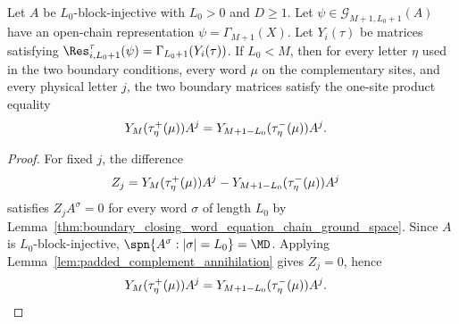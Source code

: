 \begin{lemma}
    \label{thm:boundary_closing_right_products_chain_ground_space}
    \leanok
    Let $A$ be $L_0$-block-injective with $L_0>0$ and $D\ge1$. Let
    $\psi\in\mathcal G_{M+1,L_0+1}(A)$ have an open-chain representation
    $\psi=\Gamma_{M+1}(X)$. Let $Y_i(\tau)$ be matrices satisfying
    $\Res^{\tau}_{i,L_0+1}(\psi) = \Gamma_{L_0+1}(Y_i(\tau))$.
    If $L_0<M$, then for every letter $\eta$ used in the two boundary
    conditions, every word $\mu$ on the complementary sites, and every physical
    letter $j$, the two boundary matrices satisfy the one-site product equality
    \begin{align}
        Y_M(\tau^{+}_{\eta}(\mu))A^j
         & =
        Y_{M+1-L_0}(\tau^{-}_{\eta}(\mu))A^j.
        \notag
    \end{align}
\end{lemma}

\begin{proof}
    \leanok
    For fixed $j$, the difference
    \begin{align}
        Z_j
         & =
        Y_M(\tau^{+}_{\eta}(\mu))A^j
        -
        Y_{M+1-L_0}(\tau^{-}_{\eta}(\mu))A^j
        \notag
    \end{align}
    satisfies $Z_jA^\sigma=0$ for every word $\sigma$ of length $L_0$ by
    Lemma~\ref{thm:boundary_closing_word_equation_chain_ground_space}. Since
    $A$ is $L_0$-block-injective,
    $\spn\{A^\sigma:|\sigma|=L_0\} = \MD$.
    Applying Lemma~\ref{lem:padded_complement_annihilation} gives $Z_j=0$, hence
    \begin{align}
        Y_M(\tau^{+}_{\eta}(\mu))A^j
         & =
        Y_{M+1-L_0}(\tau^{-}_{\eta}(\mu))A^j.
        \notag
    \end{align}
\end{proof}

